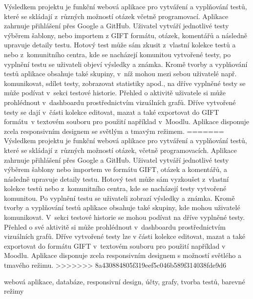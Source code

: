 \documentclass[12pt, a4paper,
openright
]{report}
\begin{document}
	\noindent Výsledkem projektu je funkční webová aplikace pro vytváření a vyplňování testů, které se skládají z~různých možností otázek včetně programovací. Aplikace zahrnuje přihlášení přes Google a GitHub. Uživatel vytváří jednotlivé testy výběrem šablony, nebo importem z GIFT formátu, otázek, komentářů a následně upravuje detaily testu. Hotový test může sám zkusit z~vlastní kolekce testů a nebo z~komunitního centra, kde se nacházejí komunitou vytvořené testy, po vyplnění testu se uživateli objeví výsledky a známka. Kromě tvorby a vyplňování testů aplikace obsahuje také skupiny, v~níž mohou mezi sebou uživatelé např. komunikovat, sdílet testy, zobrazovat statistiky apod., na dříve vyplněné testy se může podívat v~sekci testové historie. Přehled o aktivitě uživatele si může prohlédnout v~dashboardu prostřednictvím vizuálních grafů. Dříve vytvořené testy se dají v~části kolekce editovat, mazat a také exportovat do GIFT formátu~v textovém souboru pro použití například v~Moodlu. Aplikace disponuje zcela responsivním designem se světlým a tmavým režimem.
=======
	\noindent Výsledkem projektu je funkční webová aplikace pro vytváření a vyplňování testů, které se skládají z~různých možností otázek, včetně programovacích. Aplikace zahrnuje přihlášení přes Google a GitHub. Uživatel vytváří jednotlivé testy výběrem šablony nebo importem ve formátu GIFT, otázek a komentářů, a následně upravuje detaily testu. Hotový test může sám vyzkoušet z~vlastní kolekce testů nebo z~komunitního centra, kde se nacházejí testy vytvořené komunitou. Po vyplnění testu se uživateli zobrazí výsledky a známka. Kromě tvorby a vyplňování testů aplikace obsahuje také skupiny, kde mohou uživatelé komunikovat. V~sekci testové historie se mohou podívat na dříve vyplněné testy. Přehled o své aktivitě si může prohlédnout v~dashboardu prostřednictvím vizuálních grafů. Dříve vytvořené testy lze v části kolekce editovat, mazat a také exportovat do formátu GIFT v~textovém souboru pro použití například v Moodlu. Aplikace disponuje zcela responsivním designem s možností světlého a tmavého režimu.
>>>>>>> 8a430884805f319eef5c046b589f314038fde9d6
	
	\vspace{18pt}
	
	
	\noindent webová aplikace, databáze, responsivní design, účty, grafy, tvorba testů, barevné režimy
	
\end{document}
